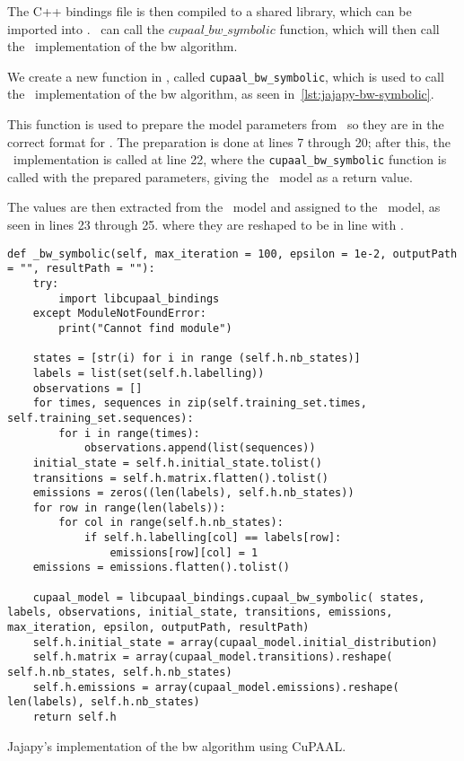 The C++ bindings file is then compiled to a shared library, which can be imported into \Jajapy.
\Jajapy\ can call the $cupaal\_bw\_symbolic$ function, which will then call the \Cupaal\ implementation of the \gls{bw} algorithm.

We create a new function in \Jajapy, called \texttt{cupaal\_bw\_symbolic}, which is used to call the \Cupaal\ implementation of the \gls{bw} algorithm, as seen in~\autoref{lst:jajapy-bw-symbolic}.

This function is used to prepare the model parameters from \Jajapy\ so they are in the correct format for \Cupaal.
The preparation is done at lines 7 through 20; after this, the \Cupaal\ implementation is called at line 22, where the \texttt{cupaal\_bw\_symbolic} function is called with the prepared parameters, giving the \Cupaal\ model as a return value.

The values are then extracted from the \Cupaal\ model and assigned to the \Jajapy\ model, as seen in lines 23 through 25. where they are reshaped to be in line with \Jajapy.

\begin{listing*}
    \begin{verbatim}
def _bw_symbolic(self, max_iteration = 100, epsilon = 1e-2, outputPath = "", resultPath = ""):
    try:
        import libcupaal_bindings
    except ModuleNotFoundError:
        print("Cannot find module")

    states = [str(i) for i in range (self.h.nb_states)]
    labels = list(set(self.h.labelling))
    observations = []
    for times, sequences in zip(self.training_set.times, self.training_set.sequences):
        for i in range(times):
            observations.append(list(sequences))
    initial_state = self.h.initial_state.tolist()
    transitions = self.h.matrix.flatten().tolist()
    emissions = zeros((len(labels), self.h.nb_states))
    for row in range(len(labels)):
        for col in range(self.h.nb_states):
            if self.h.labelling[col] == labels[row]:
                emissions[row][col] = 1
    emissions = emissions.flatten().tolist()

    cupaal_model = libcupaal_bindings.cupaal_bw_symbolic( states, labels, observations, initial_state, transitions, emissions, max_iteration, epsilon, outputPath, resultPath)
    self.h.initial_state = array(cupaal_model.initial_distribution)
    self.h.matrix = array(cupaal_model.transitions).reshape( self.h.nb_states, self.h.nb_states)
    self.h.emissions = array(cupaal_model.emissions).reshape( len(labels), self.h.nb_states)
    return self.h
      \end{verbatim}
    \caption{Jajapy's implementation of the \gls{bw} algorithm using CuPAAL.}
    \label{lst:jajapy-bw-symbolic}
\end{listing*}


